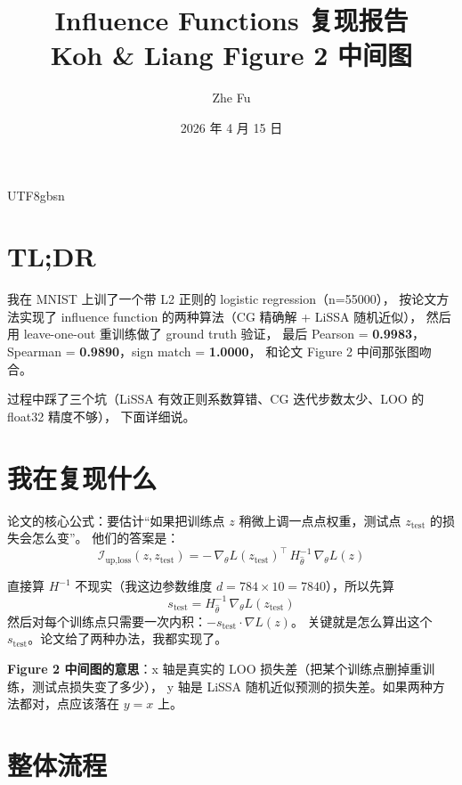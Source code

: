 \documentclass[a4paper,11pt]{article}
\title{Influence Functions 复现报告 \\ \large Koh \& Liang  Figure 2 中间图}
\author{Zhe Fu}
\date{2026 年 4 月 15 日}
\begin{document}
\begin{CJK*}{UTF8}{gbsn}

\maketitle

\section*{TL;DR}

我在 MNIST 上训了一个带 L2 正则的 logistic regression（n=55000），
按论文方法实现了 influence function 的两种算法（CG 精确解 + LiSSA 随机近似），
然后用 leave-one-out 重训练做了 ground truth 验证，
最后 Pearson = \textbf{0.9983}，Spearman = \textbf{0.9890}，sign match = \textbf{1.0000}，
和论文 Figure 2 中间那张图吻合。

过程中踩了三个坑（LiSSA 有效正则系数算错、CG 迭代步数太少、LOO 的 float32 精度不够），
下面详细说。

\section{我在复现什么}

论文的核心公式：要估计``如果把训练点 $z$ 稍微上调一点点权重，测试点 $z_{\text{test}}$ 的损失会怎么变''。
他们的答案是：
\[
\mathcal{I}_{\text{up,loss}}(z, z_{\text{test}})
  = -\, \nabla_\theta L(z_{\text{test}})^\top \, H_{\hat\theta}^{-1} \, \nabla_\theta L(z)
\]

直接算 $H^{-1}$ 不现实（我这边参数维度 $d = 784 \times 10 = 7840$），所以先算
\[
s_{\text{test}} = H_{\hat\theta}^{-1} \, \nabla_\theta L(z_{\text{test}})
\]
然后对每个训练点只需要一次内积：$-s_{\text{test}} \cdot \nabla L(z)$。
关键就是怎么算出这个 $s_{\text{test}}$。论文给了两种办法，我都实现了。

\textbf{Figure 2 中间图的意思}：x 轴是真实的 LOO 损失差（把某个训练点删掉重训练，测试点损失变了多少），
y 轴是 LiSSA 随机近似预测的损失差。如果两种方法都对，点应该落在 $y=x$ 上。

\section{整体流程}


\end{CJK*}
\end{document}
